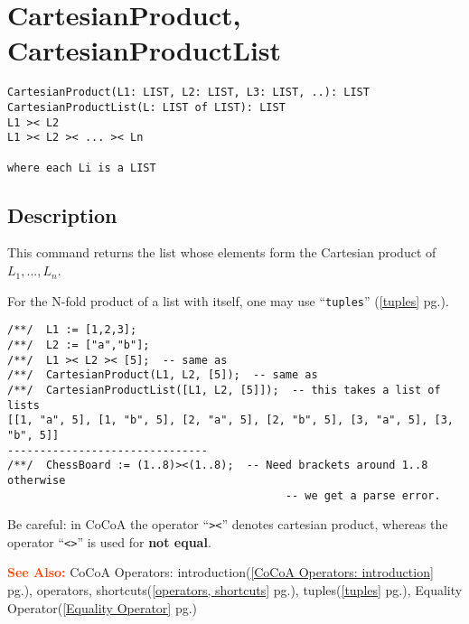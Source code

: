 \documentclass[a4paper]{mybook}
\newenvironment{command}{}{} %
\newcommand\SeeAlso{\par\textcolor{OrangeRed}{\textbf{\large See Also: }}}
\begin{document}
\section{CartesianProduct, CartesianProductList}
\label{CartesianProduct, CartesianProductList}
\begin{command} %


\begin{Verbatim}[label=syntax, rulecolor=\color{MidnightBlue},
frame=single]
CartesianProduct(L1: LIST, L2: LIST, L3: LIST, ..): LIST
CartesianProductList(L: LIST of LIST): LIST
L1 >< L2
L1 >< L2 >< ... >< Ln

where each Li is a LIST
\end{Verbatim}


\subsection*{Description}

This command returns the list whose elements form the Cartesian product
of $L_1,...,L_n$.
\par 
For the N-fold product of a list with itself, one may use ``\verb&tuples&'' (\ref{tuples} pg.\pageref{tuples}).
\begin{Verbatim}[label=example, rulecolor=\color{PineGreen}, frame=single]
/**/  L1 := [1,2,3];
/**/  L2 := ["a","b"];
/**/  L1 >< L2 >< [5];  -- same as
/**/  CartesianProduct(L1, L2, [5]);  -- same as
/**/  CartesianProductList([L1, L2, [5]]);  -- this takes a list of lists
[[1, "a", 5], [1, "b", 5], [2, "a", 5], [2, "b", 5], [3, "a", 5], [3, "b", 5]]
-------------------------------
/**/  ChessBoard := (1..8)><(1..8);  -- Need brackets around 1..8 otherwise
                                           -- we get a parse error.
\end{Verbatim}

Be careful: in CoCoA the operator ``\verb&><&'' denotes cartesian product,
whereas the operator ``\verb&<>&'' is used for \textbf{not equal}.

\SeeAlso %
  CoCoA Operators: introduction(\ref{CoCoA Operators: introduction} pg.\pageref{CoCoA Operators: introduction}), 
    operators, shortcuts(\ref{operators, shortcuts} pg.\pageref{operators, shortcuts}), 
    tuples(\ref{tuples} pg.\pageref{tuples}), 
    Equality Operator(\ref{Equality Operator} pg.\pageref{Equality Operator})
\end{command} %
\end{document}
